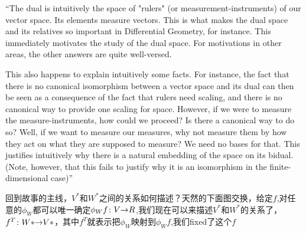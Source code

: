 \documentclass[UTF8,11pt,a4paper]{ctexart}%
\begin{document}
``The dual is intuitively the space of "rulers" (or measurement-instruments) of our vector space. Its elements measure vectors. This is what makes the dual space and its relatives so important in Differential Geometry, for instance. This immediately motivates the study of the dual space. For motivations in other areas, the other answers are quite well-versed.

This also happens to explain intuitively some facts. For instance, the fact that there is no canonical isomorphism between a vector space and its dual can then be seen as a consequence of the fact that rulers need scaling, and there is no canonical way to provide one scaling for space. However, if we were to measure the measure-instruments, how could we proceed? Is there a canonical way to do so? Well, if we want to measure our measures, why not measure them by how they act on what they are supposed to measure? We need no bases for that. This justifies intuitively why there is a natural embedding of the space on its bidual. (Note, however, that this fails to justify why it is an isomorphism in the finite-dimensional case)''



回到故事的主线，$V^{*}$和$W^{*}$之间的关系如何描述？天然的下面图交换，给定$f$,对任意的$\phi_{W}$都可以唯一确定${\phi_{W}f}\colon{V}{\to}{R}$,我们现在可以来描述$V^{*}$和$W^{*}$的关系了，${f^{T}}\colon{W*}{\to}{V*}$，其中$f^{T}$就表示把$\phi_{W}$映射到$\phi_{W}f$,我们fixed了这个$f$

\begin{center}
\end{center}
\end{document}
